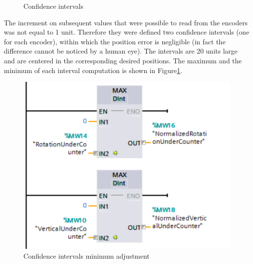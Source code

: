 \begin{figure}[!h]
\centering
{}
\qquad
{}
\caption{Confidence intervals}
\label{fig:confidence_intervals}
\end{figure}

The increment on subsequent values that were possible to read from the encoders was not equal to 1 unit. Therefore they were defined two confidence intervals (one for each encoder), within which the position error is negligible (in fact the difference cannot be noticed by a human eye). The intervals are 20 units large and are centered in the corresponding desired positions. The maximum and the minimum of each interval computation is shown in Figure\ref{fig:confidence_intervals}.

\begin{figure}[!h]
\begin{center}
\includegraphics[width=0.5\linewidth]{capitolo3/figure/Segmento1_21.PNG}
\caption{Confidence intervals minimum adjustment}
\label{fig:confidence_min}
\end{center}
\end{figure}


